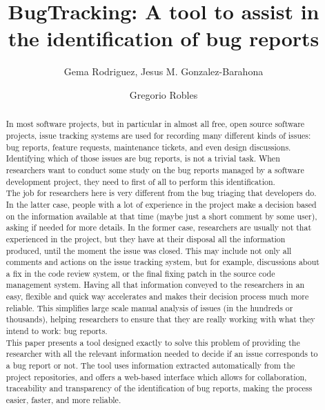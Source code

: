\documentclass[ifip]{svmult}
\begin{document}
\title*{BugTracking: A tool to assist in the identification of bug reports}
\author{Gema Rodriguez, Jesus M. Gonzalez-Barahona \and Gregorio Robles}
%
%
\maketitle

\begin{abstract}
	In most software projects, but in particular in almost all free, open source software projects, issue tracking systems are used for recording many different kinds of issues: bug reports, feature requests, maintenance tickets, and even design discussions. Identifying which of those issues are bug reports, is not a trivial task. When researchers want to conduct some study on the bug reports managed by a software development project, they need to first of all to perform this identification.\\

The job for researchers here is very different from the bug triaging that developers do. In the latter case, people with a lot of experience in the project make a decision based on the information available at that time (maybe just a short comment by some user), asking if needed for more details. In the former case, researchers are usually not that experienced in the project, but they have at their disposal all the information produced, until the moment the issue was closed. This may include not only all comments and actions on the issue tracking system, but for example, discussions about a fix in the code review system, or the final fixing patch in the source code management system. Having all that information conveyed to the researchers in an easy, flexible and quick way accelerates and makes their decision process much more reliable. This simplifies large scale manual analysis of issues (in the hundreds or thousands), helping researchers to ensure that they are really working with what they intend to work: bug reports.\\

This paper presents a tool designed exactly to solve this problem of providing the researcher with all the relevant information needed to decide if an issue corresponds to a bug report or not. The tool uses information extracted automatically from the project repositories, and offers a web-based interface which allows for collaboration, traceability and transparency of the identification of bug reports, making the process easier, faster, and more reliable.
\end{abstract}
\end{document}
